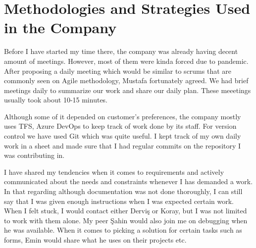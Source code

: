 \section{Methodologies and Strategies Used in the Company}
Before I have started my time there, the company was already having decent 
amount of meetings. However, most of them were kinda forced due to pandemic. 
After proposing a daily meeting which would be similar to scrums that are 
commonly seen on Agile methodology, Mustafa fortunately agreed. We had 
brief meetings daily to summarize our work and share our daily plan. These 
meeetings usually took about 10-15 minutes.
\par
Although some of it depended on customer's preferences, the company mostly 
uses TFS, Azure DevOps to keep track of work done by its staff. For version 
control we have used Git which was quite useful. I kept track of my own 
daily work in a sheet and made sure that I had regular commits on the 
repository I was contributing in.
\par
I have shared my tendencies when it comes to requirements and actively 
communicated about the needs and constraints whenever I has demanded a work. 
In that regarding although documentation was not done thoroughly, I can still 
say that I was given enough instructions when I was expected certain work. 
When I felt stuck, I would contact either Derviş or Koray, but I was not 
limited to work with them alone. My peer Şahin would also join me on debugging 
when he was available. When it comes to picking a solution for certain tasks 
such as forms, Emin would share what he uses on their projects etc.